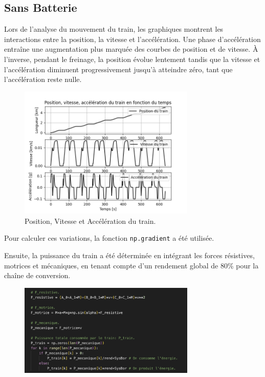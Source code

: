 \documentclass[11pt, a4paper, oneside, portrait]{report}
\begin{document}
        \subsection*{Sans Batterie}
            Lors de l’analyse du mouvement du train, les graphiques montrent les interactions entre la
            position, la vitesse et l’accélération. Une phase d’accélération entraîne une augmentation plus
            marquée des courbes de position et de vitesse. À l’inverse, pendant le freinage, la position évolue
            lentement tandis que la vitesse et l’accélération diminuent progressivement jusqu’à atteindre zéro,
            tant que l’accélération reste nulle.

            \begin{figure}[H]
                \centering
                \includegraphics[width=0.75\textwidth]{Figures/xvf.png}
                \caption{Position, Vitesse et Accélération du train.}
                \label{fig:xvf}
            \end{figure}

            Pour calculer ces variations, la fonction
            \texttt{np.gradient} a été utilisée.

            Ensuite, la puissance du train a été déterminée en intégrant les forces résistives, motrices et
            mécaniques, en tenant compte d’un rendement global de $80$\%{} pour la chaîne de conversion.

            \begin{figure}[H]
                \centering
                \includegraphics[width=0.75\textwidth]{Figures/AdamCode_0.png}
                \caption{}
                \label{fig:AdamCode_0}
            \end{figure}
\end{document}
